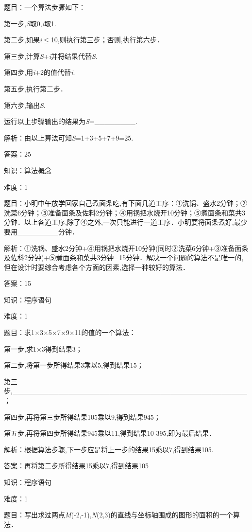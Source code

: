 \documentclass{article} %
\begin{document}
题目：一个算法步骤如下：

第一步,\textit{S}取0,\textit{i}取1.

第二步,如果\textit{i}$\mathrm{\le}$10,则执行第三步；否则,执行第六步．

第三步,计算\textit{S}+\textit{i}并将结果代替\textit{S}.

第四步,用\textit{i}+2的值代替\textit{i}.

第五步,执行第二步．

第六步,输出\textit{S}.

运行以上步骤输出的结果为\textit{S}=\_\_\_\_\_\_\_\_.

解析：由以上算法可知\textit{S}=1+3+5+7+9=25.

答案：25

知识：算法概念

难度：1

题目：小明中午放学回家自己煮面条吃,有下面几道工序：①洗锅、盛水2分钟；②洗菜6分钟；③准备面条及佐料2分钟；④用锅把水烧开10分钟；⑤煮面条和菜共3分钟．以上各道工序,除了④之外,一次只能进行一道工序．小明要将面条煮好,最少要用\_\_\_\_\_\_\_\_分钟．

解析：①洗锅、盛水2分钟+④用锅把水烧开10分钟(同时②洗菜6分钟+③准备面条及佐科2分钟)+⑤煮面条和菜共3分钟=15分钟．解决一个问题的算法不是唯一的,但在设计时要综合考虑各个方面的因素,选择一种较好的算法．

答案：15

知识：程序语句

难度：1

题目：求1$\mathrm{\times}$3$\mathrm{\times}$5$\mathrm{\times}$7$\mathrm{\times}$9$\mathrm{\times}$11的值的一个算法：

第一步,求1$\mathrm{\times}$3得到结果3；

第二步,将第一步所得结果3乘以5,得到结果15；

第三步,\_\_\_\_\_\_\_\_\_\_\_\_\_\_\_\_\_\_\_\_\_\_\_\_\_\_\_\_\_\_\_\_\_\_\_\_\_\_\_\_\_\_\_\_\_\_；

第四步,再将第三步所得结果105乘以9,得到结果945；

第五步,再将第四步所得结果945乘以11,得到结果10 395,即为最后结果．

解析：根据算法步骤,下一步应是将上一步的结果15乘以7,得到结果105.

答案：再将第二步所得结果15乘以7,得到结果105

知识：程序语句

难度：1

题目：写出求过两点\textit{M}(-2,-1),\textit{N}(2,3)的直线与坐标轴围成的图形的面积的一个算法．
\end{document}
